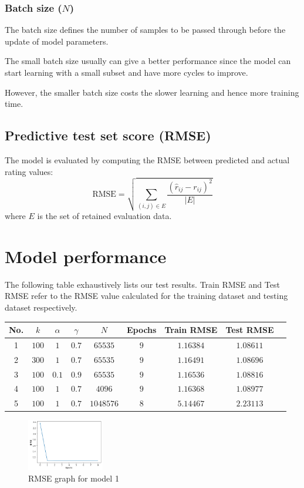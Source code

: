 \documentclass[final]{cvpr}
\begin{document}
\subsubsection{Batch size ($N$)}
The batch size defines the number of samples to be passed through before the update of model parameters.

The small batch size usually can give a better performance since the model can start learning with a small subset and have more cycles to improve.

However, the smaller batch size costs the slower learning and hence more training time.

\subsection{Predictive test set score (RMSE)}
The model is evaluated by computing the RMSE between predicted and actual rating values:
$$ \text{RMSE} = \sqrt{\sum_{(i, j) \in E} \frac{{(\hat r_{ij} - r_{ij})}^2}{\left| E \right|}} $$
where $E$ is the set of retained evaluation data.

\section{Model performance}
The following table exhaustively lists our test results. Train RMSE and Test RMSE refer to the RMSE value calculated for the training dataset and testing dataset respectively.

\begin{tabular}{|c|c|c|c|c|c|c|c|c|}
	\hline
	No. & $k$ & $\alpha$ & $\gamma$ & $N$ & Epochs & Train RMSE & Test RMSE
	\\ \hline
	1 & $100$ & $1$ & $0.7$ & $65535$ & $9$ & $1.16384$ & $1.08611$
	\\ \hline
	2 & $300$ & $1$ & $0.7$ & $65535$ & $9$ & $1.16491$ & $1.08696$
	\\ \hline
	3 & $100$ & $0.1$ & $0.9$ & $65535$ & $9$ & $1.16536$ & $1.08816$
	\\ \hline
	4 & $100$ & $1$ & $0.7$ & $4096$ & $9$ & $1.16368$ & $1.08977$
	\\ \hline
	5 & $100$ & $1$ & $0.7$ & $1048576$ & $8$ & $5.14467$ & $2.23113$
	\\ \hline
\end{tabular}


\begin{figure}[!htbp]
	\includegraphics[width=0.3\textwidth]{screenshot20210415234153.png}
	\caption{RMSE graph for model 1}
\end{figure}
\end{document}
